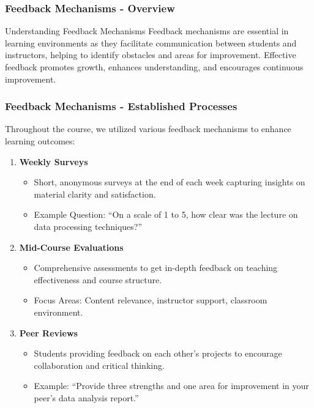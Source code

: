 \documentclass[aspectratio=169]{beamer}
\begin{document}
\begin{frame}[fragile]
    \frametitle{Feedback Mechanisms - Overview}
    \begin{block}{Understanding Feedback Mechanisms}
        Feedback mechanisms are essential in learning environments as they facilitate communication between students and instructors, helping to identify obstacles and areas for improvement. Effective feedback promotes growth, enhances understanding, and encourages continuous improvement.
    \end{block}
\end{frame}

\begin{frame}[fragile]
    \frametitle{Feedback Mechanisms - Established Processes}
    Throughout the course, we utilized various feedback mechanisms to enhance learning outcomes:
    \begin{enumerate}
        \item \textbf{Weekly Surveys} 
            \begin{itemize}
                \item Short, anonymous surveys at the end of each week capturing insights on material clarity and satisfaction.
                \item Example Question: ``On a scale of 1 to 5, how clear was the lecture on data processing techniques?''
            \end{itemize}
        \item \textbf{Mid-Course Evaluations} 
            \begin{itemize}
                \item Comprehensive assessments to get in-depth feedback on teaching effectiveness and course structure.
                \item Focus Areas: Content relevance, instructor support, classroom environment.
            \end{itemize}
        \item \textbf{Peer Reviews} 
            \begin{itemize}
                \item Students providing feedback on each other's projects to encourage collaboration and critical thinking.
                \item Example: ``Provide three strengths and one area for improvement in your peer's data analysis report.''
            \end{itemize}
    \end{enumerate}
\end{frame}
\end{document}
